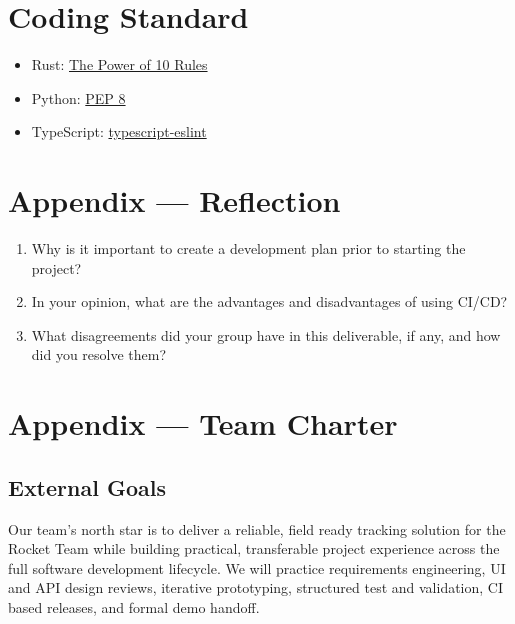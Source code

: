\documentclass{article}
\begin{document}
\section{Coding Standard}

\begin{itemize}
  \item Rust:
        \href{https://en.wikipedia.org/wiki/The_Power_of_10:_Rules_for_Developing_Safety-Critical_Code}{The
          Power of 10 Rules}
  \item Python: \href{https://peps.python.org/pep-0008/}{PEP 8}
  \item TypeScript:
        \href{https://typescript-eslint.io/packages/typescript-eslint}{typescript-eslint}

\end{itemize}


\newpage{}

\section*{Appendix --- Reflection}




\begin{enumerate}
  \item Why is it important to create a development plan prior to starting the project?
  \item In your opinion, what are the advantages and disadvantages of using CI/CD?
  \item What disagreements did your group have in this deliverable, if any, and how did
        you resolve them?
\end{enumerate}
\newpage{}
\section*{Appendix --- Team Charter}


\subsection*{External Goals}

Our team's north star is to deliver a reliable, field ready tracking solution
for the Rocket Team while building practical, transferable project experience
across the full software development lifecycle. We will practice requirements
engineering, UI and API design reviews, iterative prototyping, structured test
and validation, CI based releases, and formal demo handoff.
\end{document}
